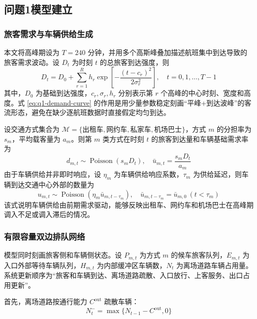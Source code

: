 \documentclass[UTF8,a4paper,11pt,onecolumn,fontset=none]{ctexart}
\begin{document}
\subsection{问题1模型建立}

\subsubsection{旅客需求与车辆供给生成}

本文将高峰期设为 $T=240$ 分钟，并用多个高斯峰叠加描述航班集中到达导致的旅客需求波动。设 $D_t$ 为时刻 $t$ 的总旅客到达强度，则
\begin{equation}
  D_t=D_0+\sum_{r=1}^{R} h_r
  \exp\left[-\frac{(t-c_r)^2}{2\sigma_r^2}\right],
  \quad t=0,1,\ldots,T-1
  \label{eq:q1-demand-curve}
\end{equation}
其中，$D_0$ 为基础到达强度，$c_r,\sigma_r,h_r$ 分别表示第 $r$ 个高峰的中心时刻、宽度和高度。式 \eqref{eq:q1-demand-curve} 的作用是用少量参数稳定刻画“平峰+到达波峰”的客流形态，避免在缺少逐航班数据时直接假定均匀到达。

设交通方式集合为 $\mathcal M=\{\text{出租车},\text{网约车},\text{私家车},\text{机场巴士}\}$，方式 $m$ 的分担率为 $s_m$，平均载客量为 $a_m$。则第 $m$ 类方式在时刻 $t$ 的旅客到达量和车辆基础需求率为
\begin{equation}
  d_{m,t}\sim \operatorname{Poisson}(s_mD_t),
  \quad
  \bar u_{m,t}=\frac{s_mD_t}{a_m}
  \label{eq:q1-mode-demand}
\end{equation}
由于车辆供给并非即时响应，设 $\eta_m$ 为车辆供给响应系数，$\tau_m$ 为供给延迟，则车辆到达交通中心外部的数量为
\begin{equation}
  u_{m,t}\sim \operatorname{Poisson}\left(\eta_m\bar u_{m,t-\tau_m}\right),
  \quad \bar u_{m,t-\tau_m}=\bar u_{m,0}\ (t<\tau_m)
  \label{eq:q1-supply-lag}
\end{equation}
该式说明车辆供给由前期需求驱动，能够反映出租车、网约车和机场巴士在高峰期调入不足或调入滞后的情况。

\subsubsection{有限容量双边排队网络}

模型同时刻画旅客侧和车辆侧状态。设 $P_{m,t}$ 为方式 $m$ 的候车旅客队列，$E_{m,t}$ 为入口外部等待车辆队列，$H_{m,t}$ 为内部缓冲区车辆数，$N_t$ 为离场道路车辆占用量。系统更新顺序为“旅客和车辆到达、离场道路疏散、入口放行、上客服务、出口占用更新”。

首先，离场道路按通行能力 $C^{\mathrm{out}}$ 疏散车辆：
\begin{equation}
  N_t^{-}=\max\{N_{t-1}-C^{\mathrm{out}},0\}
  \label{eq:q1-exit-discharge}
\end{equation}
\end{document}
